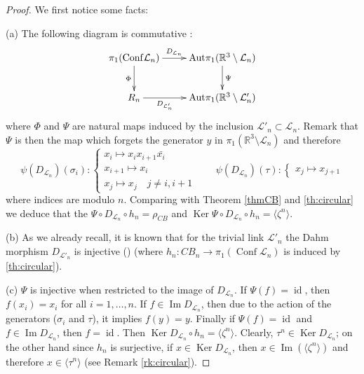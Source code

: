 \documentclass[11pt]{amsart}
\begin{document}
\begin{proof}
We first notice some facts:

(a) The following diagram is commutative :
$$ \xymatrix{
{}\pi_1({\mathop{\mathrm{Conf}}\nolimits} \mathcal{L}_n) \ar[r]^-{D_{\mathcal{L}_n}}\ar[d]_-{\Phi}  & {\mathop{\mathrm{Aut}}\nolimits}  \pi_1({\mathbb{R}}^3\setminus \mathcal{L}_n) \ar[d]^-{\Psi} \\
  R_n \ar[r]_-{D_{\mathcal{L}'_n}}        &  {\mathop{\mathrm{Aut}}\nolimits}  \pi_1({\mathbb{R}}^3\setminus \mathcal{L}'_n)
}
$$
where $\Phi$ and $\Psi$ are natural maps induced by the inclusion $\mathcal{L}'_n \subset \mathcal{L}_n$.
Remark that  $\Psi$ is then the  map which forgets the generator $y$ in $ \pi_1({\mathbb{R}}^3\setminus \mathcal{L}_n)$ and therefore 
$$\psi(D_{\mathcal{L}_n})(\sigma_i) : 
\left\{\begin{array}{l}
x_i \mapsto x_{i} x_{i+1} {\bar{{x_{i}}}} \\
x_{i+1} \mapsto x_i \\
x_{j} \mapsto x_j \quad j \neq i,i+1       
\end{array}\right.
\qquad 
\psi(D_{\mathcal{L}_n})(\tau) : 
\left\{\begin{array}{l}
x_j \mapsto x_{j+1}        
\end{array}\right.$$
where indices are modulo $n$.
Comparing with Theorem \ref{thmCB} and \ref{th:circular} we deduce that the $ \Psi \circ D_{\mathcal{L}_n} \circ h_n = \rho_{CB}$
and  ${\mathop{\mathrm{Ker}}\nolimits} \Psi \circ D_{\mathcal{L}_n} \circ h_n = \langle \zeta^n \rangle$.

(b) As we already recall, it is known that for the trivial link $\mathcal{L}'_n$ 
the Dahm morphism $D_{\mathcal{L}'_n}$ is injective (\cite{G1})
(where $h_n : CB_n \to \pi_1({\mathop{\mathrm{Conf}}\nolimits} \mathcal{L}_n)$ is induced by \ref{th:circular}).

(c) $\Psi$ is  injective when restricted to the image of $D_{\mathcal{L}_n}$.
If $\Psi(f)={\mathop{\mathrm{id}}\nolimits}$, then $f(x_i)=x_i$ for all $i=1,\ldots,n$.
If $f \in {\mathop{\mathrm{Im}}\nolimits} D_{\mathcal{L}_n}$, then due to the action of the generators ($\sigma_i$ and $\tau$), it implies $f(y)=y$.
Finally if $\Psi(f)={\mathop{\mathrm{id}}\nolimits}$ and $f \in {\mathop{\mathrm{Im}}\nolimits} D_{\mathcal{L}_n}$, then $f={\mathop{\mathrm{id}}\nolimits}$. Then ${\mathop{\mathrm{Ker}}\nolimits} D_{\mathcal{L}_n} \circ h_n = \langle \zeta^n \rangle$.
Clearly, $ \tau^n \in {\mathop{\mathrm{Ker}}\nolimits} D_{\mathcal{L}_n} $; on the other hand 
since $h_n$ is surjective, if $x \in {\mathop{\mathrm{Ker}}\nolimits} D_{\mathcal{L}_n} $, 
then $x\in {\mathop{\mathrm{Im}}\nolimits} (\langle \zeta^n \rangle)$ and therefore $x \in \langle \tau^n \rangle$
(see Remark \ref{rk:circular}).


\end{proof}
\end{document}
